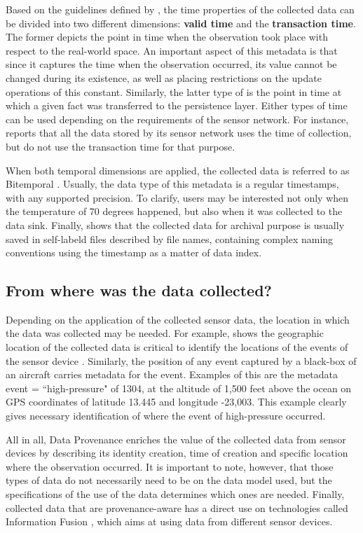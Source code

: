 Based on the guidelines defined by \cite{db-temporal}, the time properties of
the collected data can be divided into two different dimensions: \textbf{valid
time} and the \textbf{transaction time}. The former depicts the point in time
when the observation took place with respect to the real-world space. An
important aspect of this metadata is that since it captures the time when the
observation occurred, its value cannot be changed during its existence, as well
as placing restrictions on the update operations of this constant. Similarly,
the latter type of is the point in time at which a given fact was transferred
to the persistence layer. Either types of time can be used depending on the
requirements of the sensor network. For instance, \cite{sn-dataware-house}
reports that all the data stored by its sensor network uses the time of
collection, but do not use the transaction time for that purpose.

When both temporal dimensions are applied, the collected data is referred to as
Bitemporal \cite{db-temporal}. Usually, the data type of this metadata is a
regular timestamps, with any supported precision. To clarify, users may be
interested not only when the temperature of 70 degrees happened, but also when
it was collected to the data sink. Finally, \cite{sn-provenance} shows that
the collected data for archival purpose is usually saved in self-labeld
files described by file names, containing complex naming conventions using the 
timestamp as a matter of data index.

\subsection{From where was the data collected?}

Depending on the application of the collected sensor data, the location in
which the data was collected may be needed. For example, \cite{sn-geo-metadata}
shows the geographic location of the collected data is critical to identify
the locations of the events of the sensor device \cite{sn-ex02}. Similarly,
the position of any event captured by a black-box of an aircraft carries 
metadata for the event. Examples of this are the metadata event =
``high-pressure" of 1304, at the altitude of 1,500 feet above the ocean on GPS
coordinates of latitude 13.445 and longitude -23,003. This example clearly
gives necessary identification of where the event of high-pressure occurred.

All in all, Data Provenance enriches the value of the collected data from
sensor devices by describing its identity creation, time of creation and
specific location where the observation occurred. It is important to note,
however, that those types of data do not necessarily need to be on the data
model used, but the specifications of the use of the data determines which
ones are needed. Finally, collected data that are provenance-aware has a direct
use on technologies called Information Fusion \cite{sn-info-fusion}, which aims
at using data from different sensor devices.

